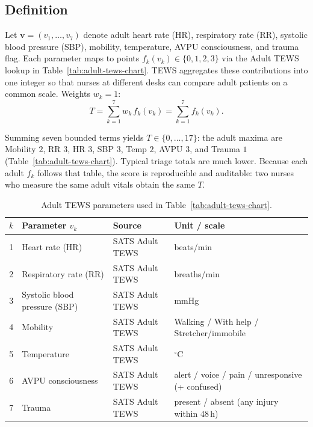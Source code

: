\subsection{Definition}

Let \(\mathbf{v} = (v_1, \ldots, v_7)\) denote adult heart rate (HR), respiratory rate (RR), systolic blood pressure (SBP), mobility, temperature, AVPU consciousness, and trauma flag. Each parameter maps to points \(f_k(v_k) \in \{0,1,2,3\}\) via the Adult TEWS lookup in Table~\ref{tab:adult-tews-chart}. TEWS aggregates these contributions into one integer so that nurses at different desks can compare adult patients on a common scale. Weights \(w_k = 1\):
\begin{equation}
  T = \sum_{k=1}^{7} w_k \, f_k(v_k) = \sum_{k=1}^{7} f_k(v_k).
  \label{eq:tews-sum}
\end{equation}

Summing seven bounded terms yields \(T \in \{0,\ldots,17\}\): the adult maxima are Mobility \(2\), RR \(3\), HR \(3\), SBP \(3\), Temp \(2\), AVPU \(3\), and Trauma \(1\) (Table~\ref{tab:adult-tews-chart}). Typical triage totals are much lower. Because each adult \(f_k\) follows that table, the score is reproducible and auditable: two nurses who measure the same adult vitals obtain the same \(T\).

\begin{table}[H]
\centering
\small
\begin{tabularx}{\textwidth}{|c|>{\raggedright\arraybackslash}X|>{\raggedright\arraybackslash}X|>{\raggedright\arraybackslash}X|}
\hline
\(k\) & Parameter \(v_k\) & Source & Unit / scale \\
\hline
1 & Heart rate (HR) & SATS Adult TEWS & beats/min \\
2 & Respiratory rate (RR) & SATS Adult TEWS & breaths/min \\
3 & Systolic blood pressure (SBP) & SATS Adult TEWS & mmHg \\
4 & Mobility & SATS Adult TEWS & Walking / With help / Stretcher/immobile \\
5 & Temperature & SATS Adult TEWS & \(^\circ\)C \\
6 & AVPU consciousness & SATS Adult TEWS & alert / voice / pain / unresponsive (+ confused) \\
7 & Trauma & SATS Adult TEWS & present / absent (any injury within 48\,h) \\
\hline
\end{tabularx}
\caption{Adult TEWS parameters used in Table~\ref{tab:adult-tews-chart}.}
\label{tab:tews-params}
\end{table}

